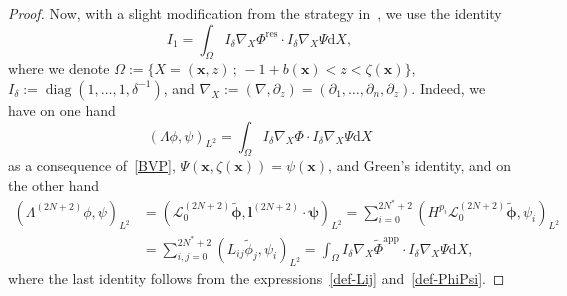 \documentclass[11pt,leqno]{article}
\numberwithin{equation}{section}
\numberwithin{figure}{section}
\begin{document}
\begin{proof}
Now, with a slight modification from the strategy in~\cite{Iguchi2018-2}, we use the identity 
%
\[
I_1 = \int_\Omega I_\delta\nabla_X\Phi^\mathrm{res} \cdot I_\delta\nabla_X\Psi \mathrm{d}X,
\]
%
where we denote $\Omega:=\{X=(\bm{x},z) \,;\, -1+b(\bm{x})<z<\zeta(\bm{x})\}$, 
$I_\delta := \operatorname{diag}(1,\ldots,1,\delta^{-1})$, and 
$\nabla_X:=(\nabla,\partial_z)=(\partial_1,\ldots,\partial_n,\partial_z)$.
Indeed, we have on one hand 
%
\[
(\Lambda \phi,\psi)_{L^2} =\int_\Omega I_\delta\nabla_X \Phi\cdot I_\delta\nabla_X\Psi \mathrm{d}X
\]
%
as a consequence of~\eqref{BVP}, $\Psi(\bm{x},\zeta(\bm{x}))=\psi(\bm{x})$, and Green's identity, 
and on the other hand 
%
\begin{align*}
(\Lambda^{(2N+2)}\phi,\psi)_{L^2} 
& =  (\mathcal{L}_0^{(2N+2)}\tilde{\bm{\phi}}, {\bm l}^{(2N+2)} \cdot {\bm{\psi}} )_{L^2} 
	= \sum_{i=0}^{2N^*+2} (H^{p_i}\mathcal{L}_0^{(2N+2)}\tilde{\bm{\phi}},  \psi_i )_{L^2} \\
& = \sum_{i,j=0}^{2N^*+2} (L_{ij}\tilde{\phi}_j,  \psi_i )_{L^2} 
	= \int_\Omega I_\delta\nabla_X\tilde{\Phi}^\mathrm{app} \cdot I_\delta\nabla_X\Psi \mathrm{d}X,
\end{align*}
%
where the last identity follows from the expressions~\eqref{def-Lij} and~\eqref{def-PhiPsi}. 



\end{proof}
\end{document}
